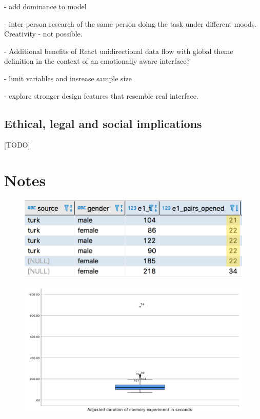- add dominance to model

- inter-person research of the same person doing the task under different moods. Creativity - not possible.

- Additional benefits of React unidirectional data flow with global theme definition in the context of an emotionally aware interface?

- limit variables and insrease sample size

- explore stronger design features that resemble real interface.

\subsection{Ethical, legal and social implications}

[TODO]

\section{Notes}

\begin{figure}[ht!]
	\centering
	\begin{minipage}{.4\textwidth}
		\centering
		\includegraphics[width=1\linewidth]{graphics/MemoryOutlier1}
		\label{fig:test1}
	\end{minipage}%
	\begin{minipage}{.6\textwidth}
		\centering
		\includegraphics[width=1\linewidth]{graphics/memoryOutlier2}
		\label{fig:test2}
	\end{minipage}
\end{figure}




